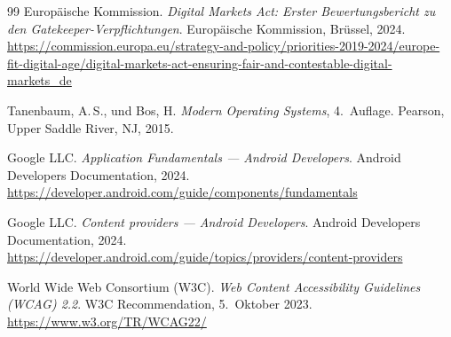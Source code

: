 ﻿\documentclass[12pt, a4paper]{article}
\begin{document}
\begin{thebibliography}{99}
Europäische Kommission.
\newblock \emph{Digital Markets Act: Erster Bewertungsbericht zu den Gatekeeper-Verpflichtungen}.
\newblock Europäische Kommission, Brüssel, 2024.
\newblock \url{https://commission.europa.eu/strategy-and-policy/priorities-2019-2024/europe-fit-digital-age/digital-markets-act-ensuring-fair-and-contestable-digital-markets_de}

Tanenbaum, A.\,S., und Bos, H.
\newblock \emph{Modern Operating Systems}, 4.~Auflage.
\newblock Pearson, Upper Saddle River, NJ, 2015.

Google LLC.
\newblock \emph{Application Fundamentals --- Android Developers}.
\newblock Android Developers Documentation, 2024.
\newblock \url{https://developer.android.com/guide/components/fundamentals}

Google LLC.
\newblock \emph{Content providers --- Android Developers}.
\newblock Android Developers Documentation, 2024.
\newblock \url{https://developer.android.com/guide/topics/providers/content-providers}

World Wide Web Consortium (W3C).
\newblock \emph{Web Content Accessibility Guidelines (WCAG) 2.2}.
\newblock W3C Recommendation, 5.~Oktober 2023.
\newblock \url{https://www.w3.org/TR/WCAG22/}

\end{thebibliography}
\end{document}
